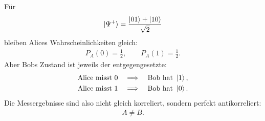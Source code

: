 \documentclass[11pt,a4paper]{scrartcl}
\begin{document}
\begin{enumerate}[label=(\alph*)]
\begin{calculationbox}
            \begin{solutionbox}[title=Ergebnisse für $\ket{\Psi^+}$]
                Für
                \begin{align*}
                    \ket{\Psi^+}
                    =
                    \frac{\ket{01}+\ket{10}}{\sqrt2}
                \end{align*}
                bleiben Alices Wahrscheinlichkeiten gleich:
                \begin{align*}
                    P_A(0)=\frac12,
                    \qquad
                    P_A(1)=\frac12.
                \end{align*}
                Aber Bobs Zustand ist jeweils der entgegengesetzte:
                \begin{align*}
                    \text{Alice misst }0
                    &\quad\Longrightarrow\quad
                    \text{Bob hat }\ket{1},
                    \\
                    \text{Alice misst }1
                    &\quad\Longrightarrow\quad
                    \text{Bob hat }\ket{0}.
                \end{align*}
                Die Messergebnisse sind also nicht gleich korreliert, sondern perfekt antikorreliert:
                \begin{align*}
                    A\neq B.
                \end{align*}
            \end{solutionbox}
        \end{calculationbox}
    \end{enumerate}
\end{document}
